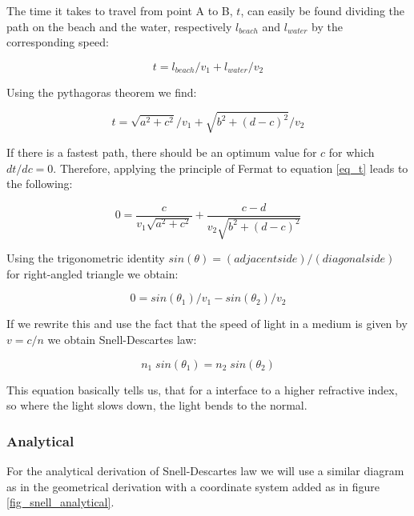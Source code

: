 \documentclass{article}
\begin{document}
The time it takes to travel from point A to B, $t$, can easily be found dividing the path on the beach and the water, respectively $l_{beach}$ and $l_{water}$ by the corresponding speed:

\begin{equation}
	t = l_{beach}/v_1 + l_{water}/v_2
\end{equation}

Using the pythagoras theorem we find:

\begin{equation}
	t = \sqrt{a^2 + c^2}/v_1 + \sqrt{b^2 + (d-c)^2}/v_2
	\label{eq_t}
\end{equation}

If there is a fastest path, there should be an optimum value for $c$ for which $dt/dc = 0$. Therefore, applying the principle of Fermat to equation \ref{eq_t} leads to the following:

\begin{equation}
	0 = \frac{c}{v_1 \sqrt{a^2 + c^2}} + \frac{c-d}{v_2 \sqrt{b^2 + (d-c)^2}}
\end{equation}

Using the trigonometric identity $sin(\theta) = (adjacent side)/(diagonal side)$ for right-angled triangle we obtain:

\begin{equation}
	0 =  sin(\theta _1)/v_1 - sin(\theta _2)/v_2
\end{equation}

If we rewrite this and use the fact that the speed of light in a medium is given by $v = c/n$ we obtain Snell-Descartes law:

\begin{equation}
	n_1 \; sin(\theta _1) = n_2 \; sin(\theta _2)
\end{equation}

This equation basically tells us, that for a interface to a higher refractive index, so where the light slows down, the light bends to the normal.

\subsubsection{Analytical}

For the analytical derivation of Snell-Descartes law we will use a similar diagram as in the geometrical derivation with a coordinate system added as in figure \ref{fig_snell_analytical}.
\end{document}
